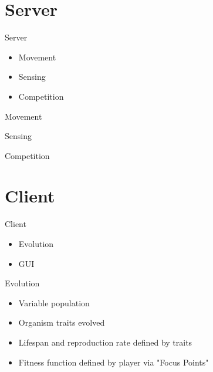 \documentclass[11pt]{beamer}
\begin{document}
\section{Server}
\begin{frame}{Server}
\begin{itemize}
	\item Movement
	\item Sensing
	\item Competition
\end{itemize}
\end{frame}

\begin{frame}{Movement}

\end{frame}

\begin{frame}{Sensing}

\end{frame}

\begin{frame}{Competition}

\end{frame}

\section{Client}
\begin{frame}{Client}
\begin{itemize}
	\item Evolution
	\item GUI
\end{itemize}
\end{frame}

\begin{frame}{Evolution}
\begin{itemize}
	\item<1-> Variable population
	\item<2-> Organism traits evolved
	\item<3-> Lifespan and reproduction rate defined by traits
	\item<4-> Fitness function defined by player via "Focus Points"
\end{itemize}
\end{frame}
\end{document}
